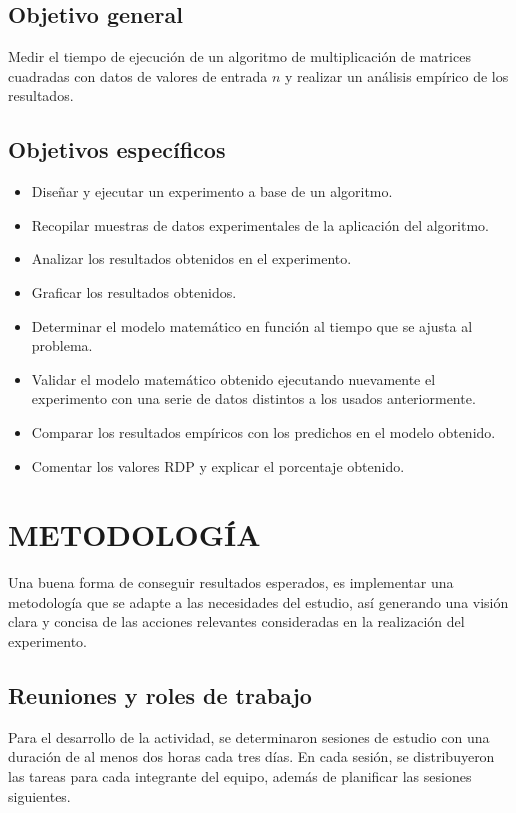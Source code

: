 \documentclass[11pt, twocolumn]{llncs}
\begin{document}
\subsection{Objetivo general}
Medir el tiempo de ejecución de un algoritmo de multiplicación de matrices cuadradas con datos de valores de entrada $n$ y realizar un análisis empírico de los resultados.

\subsection{Objetivos específicos}
\begin{itemize}
    \item Diseñar y ejecutar un experimento a base de un algoritmo.
    \item Recopilar muestras de datos experimentales de la aplicación del algoritmo.
    \item Analizar los resultados obtenidos en el experimento.
    \item Graficar los resultados obtenidos.
    \item Determinar el modelo matemático en función al tiempo que se ajusta al problema.
    \item Validar el modelo matemático obtenido ejecutando nuevamente el experimento con una serie de datos distintos a los usados anteriormente.
    \item Comparar los resultados empíricos con los predichos en el modelo obtenido.
    \item Comentar los valores RDP y explicar el porcentaje obtenido.
\end{itemize}

\section{METODOLOGÍA}\label{metodología}
Una buena forma de conseguir resultados esperados, es implementar una metodología que se adapte a las necesidades del estudio, así generando una visión clara y concisa de las acciones relevantes consideradas en la realización del experimento.

\subsection{Reuniones y roles de trabajo}
Para el desarrollo de la actividad, se determinaron sesiones de estudio con una duración de al menos dos horas cada tres días. En cada sesión, se distribuyeron las tareas para cada integrante del equipo, además de planificar las sesiones siguientes.
\end{document}
